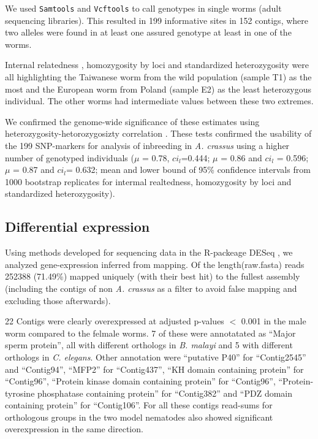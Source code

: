 \documentclass[10pt]{bmc_article}
\newenvironment{bmcformat}{\begin{raggedright}\baselineskip20pt\sloppy\setboolean{publ}{false}}{\end{raggedright}\baselineskip20pt\sloppy}
\begin{document}
\begin{bmcformat}
We used \texttt{Samtools}\cite{journals/bioinformatics/LiHWFRHMAD09}
and \texttt{Vcftools}\cite{pmid21653522} to call genotypes in single
worms (adult sequencing libraries). This resulted in 199
informative sites in 152 contigs, where two alleles
were found in at least one assured genotype at least in one of the
worms.

Internal relatedness \cite{pmid11571049}, homozygosity by loci
\cite{pmid17107491} and standardized heterozygosity \cite{coltman81j}
were all highlighting the Taiwanese worm from the wild population
(sample T1) as the most and the European worm from Poland (sample E2)
as the least heterozygous individual. The other worms had intermediate
values between these two extremes.

We confirmed the genome-wide significance of these estimates using
heterozygosity-hetorozygosizty correlation \cite{pmid21565077}. These
tests confirmed the usability of the 199 SNP-markers for
analysis of inbreeding in \textit{A. crassus} using a higher number of
genotyped individuals ($\mu$ = 0.78, $ci_l$=0.444; $\mu$ = 0.86 and
$ci_l$ = 0.596; $\mu$ = 0.87 and $ci_l$= 0.632; mean and lower bound of
95\% confidence intervals from 1000 bootstrap replicates for intermal
realtedness, homozygosity by loci and standardized heterozygosity).

\subsection*{Differential expression}
                

Using methods developed for sequencing data in the R-packeage DESeq
\cite{pmid20979621}, we analyzed gene-expression inferred from
mapping. Of the {length(raw.fasta)} reads 252388
(71.49\%) mapped uniquely
(with their best hit) to the fullest assembly (including the contigs
of non \textit{A. crassus} as a filter to avoid false mapping and
excluding those afterwards).

22 Contigs were clearly overexpressed at adjusted p-values $<$ 0.001
in the male worm compared to the felmale worms.
7 of these were
annotatated as ``Major sperm protein'', all with different orthologs
in \textit{B. malayi} and
5
with different orthologs in \textit{C. elegans}. Other annotation were
``putative P40'' for ``Contig2545'' and ``Contig94'', ``MFP2'' for
``Contig437'', ``KH domain containing protein'' for ``Contig96'',
``Protein kinase domain containing protein'' for ``Contig96'',
``Protein-tyrosine phosphatase containing protein'' for ``Contig382''
and ``PDZ domain containing protein'' for ``Contig106''. For all these
contigs read-sums for orthologous groups in the two model nematodes
also showed significant overexpression in the same direction.


\end{bmcformat}
\end{document}

